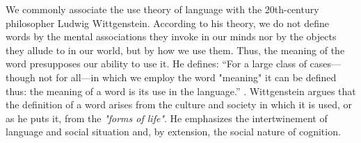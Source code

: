 We commonly associate the use theory of language with the 20th-century philosopher Ludwig Wittgenstein. According to his theory, we do not define words by the mental associations they invoke in our minds nor by the objects they allude to in our world, but by how we use them. Thus, the meaning of the word presupposes our ability to use it. He defines: ``For a large class of cases—though not for all—in which we employ the word "meaning" it can be defined thus: the meaning of a word is its use in the language.'' \parencite{wittgenstein_53}. Wittgenstein argues that the definition of a word arises from the culture and society in which it is used, or as he puts it, from the \textit{"forms of life"}. He emphasizes the intertwinement of language and social situation and, by extension, the social nature of cognition.






